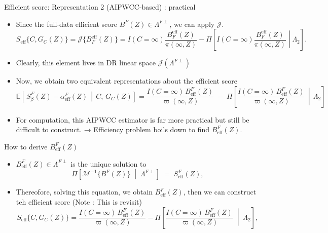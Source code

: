 \documentclass[xcolor=dvipsnames,aspectratio=169]{beamer}
\newcommand{\1}{\mathbbm{1}}
\begin{document}
\begin{frame}{Efficient score: Representation 2 (AIPWCC-based) : practical}
  \begin{itemize}
    \item Since the full-data efficient score $B^F(Z)\in \Lambda^{F\perp}$, we can apply $\mathcal{J}$.
  \[
    S_{\text{eff}}\{C,G_C(Z)\}=\mathcal{J}\big\{B_F^{\text{eff}}(Z)\big\}
    =I(C=\infty)\frac{B_F^{\text{eff}}(Z)}{\pi(\infty,Z)}-\Pi\!\left[I(C=\infty)\frac{B_F^{\text{eff}}(Z)}{\pi(\infty,Z)}\middle|\Lambda_2 \right].
  \]
  \item Clearly, this element lives in DR linear space $\mathcal{J}(\Lambda^{F\perp})$
  \item Now, we obtain two equivalent representations about the efficient score
  \[
  \mathbb{E}\!\left[\, S^{F}_{\beta}(Z) - \alpha^{F}_{\mathrm{eff}}(Z) \,\middle|\, C,\, G_{C}(Z) \right]
=
\frac{I(C=\infty)\, B^{F}_{\mathrm{eff}}(Z)}{\varpi(\infty, Z)}
\;-\;
\Pi\!\left[
  \frac{I(C=\infty)\, B^{F}_{\mathrm{eff}}(Z)}{\varpi(\infty, Z)}
  \,\middle|\, \Lambda_{2}
\right]
  \]
  \item For computation, this AIPWCC estimator is far more practical but still be difficult to construct. → Efficiency problem boils down to find $B^{F}_{\mathrm{eff}}(Z)$.
  \end{itemize}
\end{frame}

\begin{frame}{How to derive $B^{F}_{\mathrm{eff}}(Z)$}
  \begin{tcolorbox}[colframe=Cyan,title=Theorem 11.1]
    \begin{itemize}
      \item $B^{F}_{\mathrm{eff}}(Z)\in \Lambda^{F\perp}$ is the unique solution to
      \[
        \Pi\!\left[ \mathcal{M}^{-1}\{B^{F}(Z)\} \;\middle|\; \Lambda^{F\perp} \right]
        \;=\; S^{F}_{\mathrm{eff}}(Z),
      \]
    \end{itemize}
  \end{tcolorbox}
  \begin{itemize}
    \item Thereofore, solving this equation, we obtain $B^{F}_{\mathrm{eff}}(Z)$, then we can construct teh efficient score (Note : This is revisit)
    \[
    S_{\mathrm{eff}}\{C,G_C(Z)\}
=
\frac{I(C=\infty)\,B^{F}_{\mathrm{eff}}(Z)}{\varpi(\infty,Z)}
-
\Pi\!\left[
  \frac{I(C=\infty)\,B^{F}_{\mathrm{eff}}(Z)}{\varpi(\infty,Z)}
  \;\middle|\; \Lambda_2
\right],
    \]
  \end{itemize}
\end{frame}
\end{document}
